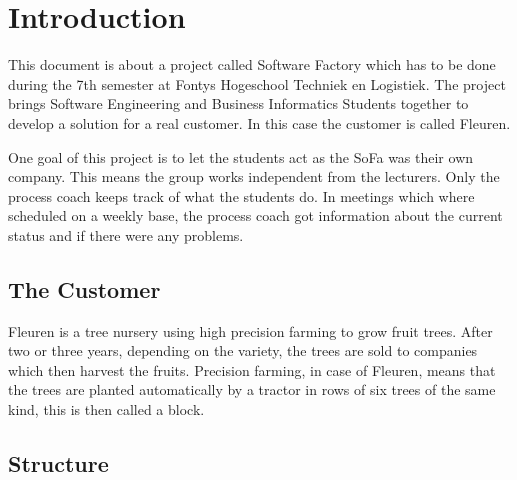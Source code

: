 \section{Introduction}
This document is about a project called Software Factory which has to be done during the 7th semester at Fontys Hogeschool Techniek en Logistiek. The project brings Software Engineering and Business Informatics Students together to develop a solution for a real customer. In this case the customer is called Fleuren. 

One goal of this project is to let the students act as the SoFa was their own company. This means the group works independent from the lecturers. Only the process coach keeps track of what the students do. In meetings which where scheduled on a weekly base, the process coach got information about the current status and if there were any problems. 

\subsection{The Customer}
Fleuren is a tree nursery using high precision farming to grow fruit trees. After two or three years, depending on the variety, the trees are sold to companies which then harvest the fruits. Precision farming, in case of Fleuren, means that the trees are planted automatically by a tractor in rows of six trees of the same kind, this is then called a block.

\subsection{Structure}

